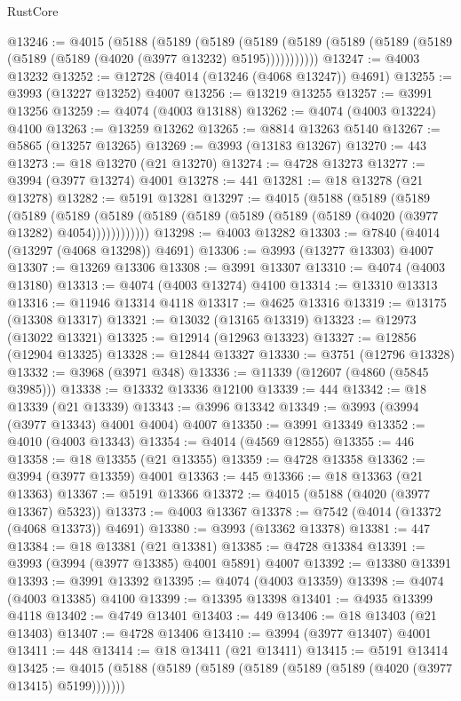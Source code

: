 \begin{lexlean}{RustCore}
\begin{coremodule}
@13246 := @4015
    (@5188
      (@5189
        (@5189
          (@5189 (@5189 (@5189 (@5189 (@5189 (@5189 (@5189 (@4020 (@3977 @13232) @5195)))))))))))
@13247 := @4003 @13232
@13252 := @12728 (@4014 (@13246 (@4068 @13247)) @4691)
@13255 := @3993 (@13227 @13252) @4007
@13256 := @13219 @13255
@13257 := @3991 @13256
@13259 := @4074 (@4003 @13188)
@13262 := @4074 (@4003 @13224) @4100
@13263 := @13259 @13262
@13265 := @8814 @13263 @5140
@13267 := @5865 (@13257 @13265)
@13269 := @3993 (@13183 @13267)
@13270 := 443
@13273 := @18 @13270 (@21 @13270)
@13274 := @4728 @13273
@13277 := @3994 (@3977 @13274) @4001
@13278 := 441
@13281 := @18 @13278 (@21 @13278)
@13282 := @5191 @13281
@13297 := @4015
    (@5188
      (@5189
        (@5189
          (@5189
            (@5189 (@5189 (@5189 (@5189 (@5189 (@5189 (@5189 (@4020 (@3977 @13282) @4054))))))))))))
@13298 := @4003 @13282
@13303 := @7840 (@4014 (@13297 (@4068 @13298)) @4691)
@13306 := @3993 (@13277 @13303) @4007
@13307 := @13269 @13306
@13308 := @3991 @13307
@13310 := @4074 (@4003 @13180)
@13313 := @4074 (@4003 @13274) @4100
@13314 := @13310 @13313
@13316 := @11946 @13314 @4118
@13317 := @4625 @13316
@13319 := @13175 (@13308 @13317)
@13321 := @13032 (@13165 @13319)
@13323 := @12973 (@13022 @13321)
@13325 := @12914 (@12963 @13323)
@13327 := @12856 (@12904 @13325)
@13328 := @12844 @13327
@13330 := @3751 (@12796 @13328)
@13332 := @3968 (@3971 @348)
@13336 := @11339 (@12607 (@4860 (@5845 @3985)))
@13338 := @13332 @13336 @12100
@13339 := 444
@13342 := @18 @13339 (@21 @13339)
@13343 := @3996 @13342
@13349 := @3993 (@3994 (@3977 @13343) @4001 @4004) @4007
@13350 := @3991 @13349
@13352 := @4010 (@4003 @13343)
@13354 := @4014 (@4569 @12855)
@13355 := 446
@13358 := @18 @13355 (@21 @13355)
@13359 := @4728 @13358
@13362 := @3994 (@3977 @13359) @4001
@13363 := 445
@13366 := @18 @13363 (@21 @13363)
@13367 := @5191 @13366
@13372 := @4015 (@5188 (@4020 (@3977 @13367) @5323))
@13373 := @4003 @13367
@13378 := @7542 (@4014 (@13372 (@4068 @13373)) @4691)
@13380 := @3993 (@13362 @13378)
@13381 := 447
@13384 := @18 @13381 (@21 @13381)
@13385 := @4728 @13384
@13391 := @3993 (@3994 (@3977 @13385) @4001 @5891) @4007
@13392 := @13380 @13391
@13393 := @3991 @13392
@13395 := @4074 (@4003 @13359)
@13398 := @4074 (@4003 @13385) @4100
@13399 := @13395 @13398
@13401 := @4935 @13399 @4118
@13402 := @4749 @13401
@13403 := 449
@13406 := @18 @13403 (@21 @13403)
@13407 := @4728 @13406
@13410 := @3994 (@3977 @13407) @4001
@13411 := 448
@13414 := @18 @13411 (@21 @13411)
@13415 := @5191 @13414
@13425 := @4015 (@5188 (@5189 (@5189 (@5189 (@5189 (@5189 (@4020 (@3977 @13415) @5199)))))))

\end{coremodule}
\end{lexlean}
